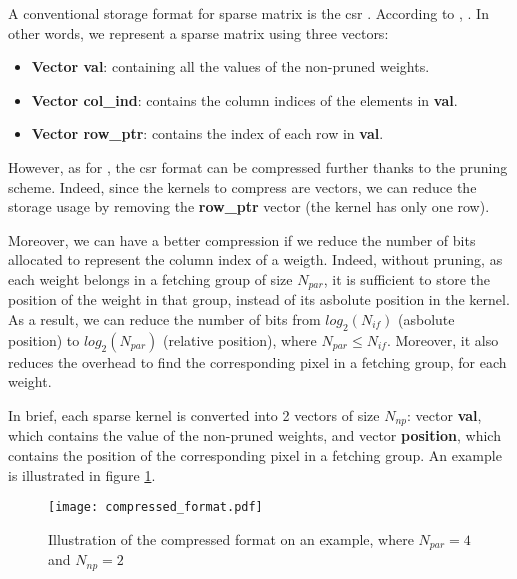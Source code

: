A conventional storage format for sparse matrix is the \acrfull{csr} \cite{buluc_parallel_2009}. According to \textcite{buluc_parallel_2009}, . In other words, we represent a sparse matrix using three vectors:
%
\begin{itemize}
    \item \textbf{Vector val}: containing all the values of the non-pruned weights.
    \item \textbf{Vector col\_ind}: contains the column indices of the elements in \textbf{val}.
    \item \textbf{Vector row\_ptr}: contains the index of each row in \textbf{val}.
\end{itemize}
%
However, as for \cite{zhu_efficient_2020}, the \acrshort{csr} format can be compressed further thanks to the pruning scheme. Indeed, since the kernels to compress are vectors, we can reduce the storage usage by removing the \textbf{row\_ptr} vector (the kernel has only one row). 

Moreover, we can have a better compression if we reduce the number of bits allocated to represent the column index of a weigth. Indeed, without pruning, as each weight belongs in a fetching group of size $N_{par}$, it is sufficient to store the position of the weight in that group, instead of its asbolute position in the kernel. As a result, we can reduce the number of bits from $log_2(N_{if})$ (asbolute position) to $log_2(N_{par})$ (relative position), where $N_{par} \leq N_{if}$. Moreover, it also reduces the overhead to find the corresponding pixel in a fetching group, for each weight.

In brief, each sparse kernel is converted into 2 vectors of size $N_{np}$: vector \textbf{val}, which contains the value of the non-pruned weights, and vector \textbf{position}, which contains the position of the corresponding pixel in a fetching group. An example is illustrated in figure \ref{fig:compressed_format}.
%
\begin{figure}[H]
    \centering
    \texttt{[image: compressed\_format.pdf]}
    \caption{Illustration of the compressed format on an example, where $N_{par} = 4$ and $N_{np} = 2$}
    \label{fig:compressed_format}
\end{figure}

